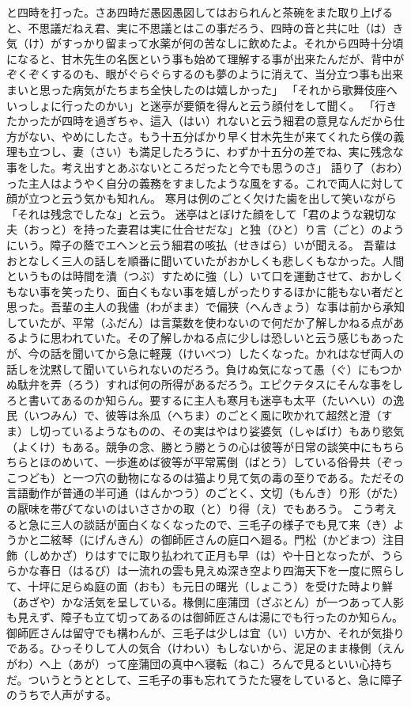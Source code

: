 \documentclass{book}
\begin{document}
と四時を打った。さあ四時だ愚図愚図してはおられんと茶碗をまた取り上げると、不思議だねえ君、実に不思議とはこの事だろう、四時の音と共に吐（は）き気（け）がすっかり留まって水薬が何の苦なしに飲めたよ。それから四時十分頃になると、甘木先生の名医という事も始めて理解する事が出来たんだが、背中がぞくぞくするのも、眼がぐらぐらするのも夢のように消えて、当分立つ事も出来まいと思った病気がたちまち全快したのは嬉しかった」
「それから歌舞伎座へいっしょに行ったのかい」と迷亭が要領を得んと云う顔付をして聞く。
「行きたかったが四時を過ぎちゃ、這入（はい）れないと云う細君の意見なんだから仕方がない、やめにしたさ。もう十五分ばかり早く甘木先生が来てくれたら僕の義理も立つし、妻（さい）も満足したろうに、わずか十五分の差でね、実に残念な事をした。考え出すとあぶないところだったと今でも思うのさ」
語り了（おわ）った主人はようやく自分の義務をすましたような風をする。これで両人に対して顔が立つと云う気かも知れん。
寒月は例のごとく欠けた歯を出して笑いながら「それは残念でしたな」と云う。
迷亭はとぼけた顔をして「君のような親切な夫（おっと）を持った妻君は実に仕合せだな」と独（ひと）り言（ごと）のようにいう。障子の蔭でエヘンと云う細君の咳払（せきばら）いが聞える。
吾輩はおとなしく三人の話しを順番に聞いていたがおかしくも悲しくもなかった。人間というものは時間を潰（つぶ）すために強（し）いて口を運動させて、おかしくもない事を笑ったり、面白くもない事を嬉しがったりするほかに能もない者だと思った。吾輩の主人の我儘（わがまま）で偏狭（へんきょう）な事は前から承知していたが、平常（ふだん）は言葉数を使わないので何だか了解しかねる点があるように思われていた。その了解しかねる点に少しは恐しいと云う感じもあったが、今の話を聞いてから急に軽蔑（けいべつ）したくなった。かれはなぜ両人の話しを沈黙して聞いていられないのだろう。負けぬ気になって愚（ぐ）にもつかぬ駄弁を弄（ろう）すれば何の所得があるだろう。エピクテタスにそんな事をしろと書いてあるのか知らん。要するに主人も寒月も迷亭も太平（たいへい）の逸民（いつみん）で、彼等は糸瓜（へちま）のごとく風に吹かれて超然と澄（すま）し切っているようなものの、その実はやはり娑婆気（しゃばけ）もあり慾気（よくけ）もある。競争の念、勝とう勝とうの心は彼等が日常の談笑中にもちらちらとほのめいて、一歩進めば彼等が平常罵倒（ばとう）している俗骨共（ぞっこつども）と一つ穴の動物になるのは猫より見て気の毒の至りである。ただその言語動作が普通の半可通（はんかつう）のごとく、文切（もんき）り形（がた）の厭味を帯びてないのはいささかの取（と）り得（え）でもあろう。
こう考えると急に三人の談話が面白くなくなったので、三毛子の様子でも見て来（き）ようかと二絃琴（にげんきん）の御師匠さんの庭口へ廻る。門松（かどまつ）注目飾（しめかざ）りはすでに取り払われて正月も早（は）や十日となったが、うららかな春日（はるび）は一流れの雲も見えぬ深き空より四海天下を一度に照らして、十坪に足らぬ庭の面（おも）も元日の曙光（しょこう）を受けた時より鮮（あざや）かな活気を呈している。椽側に座蒲団（ざぶとん）が一つあって人影も見えず、障子も立て切ってあるのは御師匠さんは湯にでも行ったのか知らん。御師匠さんは留守でも構わんが、三毛子は少しは宜（い）い方か、それが気掛りである。ひっそりして人の気合（けわい）もしないから、泥足のまま椽側（えんがわ）へ上（あが）って座蒲団の真中へ寝転（ねこ）ろんで見るといい心持ちだ。ついうとうととして、三毛子の事も忘れてうたた寝をしていると、急に障子のうちで人声がする。
\end{document}
